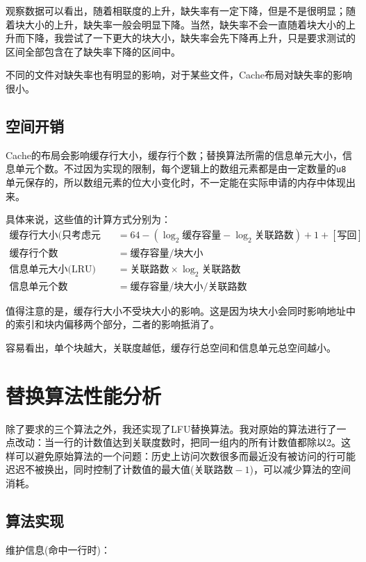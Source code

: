 \documentclass[12pt, UTF8]{article}
\begin{document}
观察数据可以看出，随着相联度的上升，缺失率有一定下降，但是不是很明显；随着块大小的上升，缺失率一般会明显下降。当然，缺失率不会一直随着块大小的上升而下降，我尝试了一下更大的块大小，缺失率会先下降再上升，只是要求测试的区间全部包含在了缺失率下降的区间中。

不同的文件对缺失率也有明显的影响，对于某些文件，Cache布局对缺失率的影响很小。

\subsection{空间开销}

Cache的布局会影响缓存行大小，缓存行个数；替换算法所需的信息单元大小，信息单元个数。不过因为实现的限制，每个逻辑上的数组元素都是由一定数量的\lstinline|u8|单元保存的，所以数组元素的位大小变化时，不一定能在实际申请的内存中体现出来。

具体来说，这些值的计算方式分别为：
\begin{align*}
\text{缓存行大小(只考虑元信息)} &= 64 - (\log_2\text{缓存容量} - \log_2\text{关联路数}) + 1 + [\text{写回}] \\
\text{缓存行个数} &= \text{缓存容量} / \text{块大小} \\
\text{信息单元大小(LRU)} &= \text{关联路数} \times \log_2\text{关联路数} \\
\text{信息单元个数} &= \text{缓存容量} / \text{块大小} / \text{关联路数}
\end{align*}

值得注意的是，缓存行大小不受块大小的影响。这是因为块大小会同时影响地址中的索引和块内偏移两个部分，二者的影响抵消了。

容易看出，单个块越大，关联度越低，缓存行总空间和信息单元总空间越小。

\section{替换算法性能分析}

除了要求的三个算法之外，我还实现了LFU替换算法。我对原始的算法进行了一点改动：当一行的计数值达到关联度数时，把同一组内的所有计数值都除以2。这样可以避免原始算法的一个问题：历史上访问次数很多而最近没有被访问的行可能迟迟不被换出，同时控制了计数值的最大值($\text{关联路数} - 1$)，可以减少算法的空间消耗。

\subsection{算法实现}

维护信息(命中一行时)：
\end{document}
